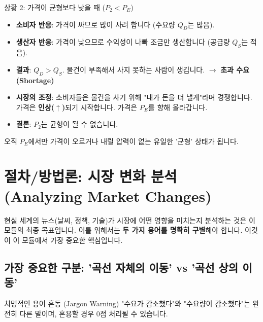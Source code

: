 \documentclass[11pt,a4paper]{article}
\theoremstyle{definition}
\begin{document}
\begin{mybox}{상황 2: 가격이 균형보다 낮을 때 ($P_2 < P_E$)}
    \begin{itemize}
        \item \textbf{소비자 반응}: 가격이 싸므로 많이 사려 합니다 (수요량 $Q_D$는 많음).
        \item \textbf{생산자 반응}: 가격이 낮으므로 수익성이 나빠 조금만 생산합니다 (공급량 $Q_S$는 적음).
        \item \textbf{결과}: $Q_D > Q_S$. 물건이 부족해서 사지 못하는 사람이 생깁니다. $\rightarrow$ \textbf{초과 수요 (Shortage)}
        \item \textbf{시장의 조정}: 소비자들은 물건을 사기 위해 "내가 돈을 더 낼게"라며 경쟁합니다. 가격은 \textbf{인상($\uparrow$)}되기 시작합니다. 가격은 $P_E$를 향해 올라갑니다.
        \item \textbf{결론}: $P_2$는 균형이 될 수 없습니다.
    \end{itemize}
\end{mybox}

오직 $P_E$에서만 가격이 오르거나 내릴 압력이 없는 유일한 '균형' 상태가 됩니다.

\newpage

\section{절차/방법론: 시장 변화 분석 (Analyzing Market Changes)}

현실 세계의 뉴스(날씨, 정책, 기술)가 시장에 어떤 영향을 미치는지 분석하는 것은 이 모듈의 최종 목표입니다.
이를 위해서는 \textbf{두 가지 용어를 명확히 구별}해야 합니다. 이것이 이 모듈에서 가장 중요한 핵심입니다.

\subsection{가장 중요한 구분: '곡선 자체의 이동' vs '곡선 상의 이동'}

\begin{warningbox}{치명적인 용어 혼동 (Jargon Warning)}
    "수요가 감소했다"와 "수요량이 감소했다"는 완전히 다른 말이며, 혼용할 경우 0점 처리될 수 있습니다.
\end{warningbox}
\end{document}
